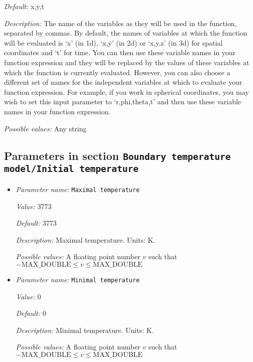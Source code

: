 \begin{itemize}
{\it Default:} x,y,t


{\it Description:} The name of the variables as they will be used in the function, separated by commas. By default, the names of variables at which the function will be evaluated is `x' (in 1d), `x,y' (in 2d) or `x,y,z' (in 3d) for spatial coordinates and `t' for time. You can then use these variable names in your function expression and they will be replaced by the values of these variables at which the function is currently evaluated. However, you can also choose a different set of names for the independent variables at which to evaluate your function expression. For example, if you work in spherical coordinates, you may wish to set this input parameter to `r,phi,theta,t' and then use these variable names in your function expression.


{\it Possible values:} Any string
\end{itemize}

\subsection{Parameters in section \tt Boundary temperature model/Initial temperature}
\label{parameters:Boundary_20temperature_20model/Initial_20temperature}

\begin{itemize}
\item {\it Parameter name:} {\tt Maximal temperature}
\label{parameters:Boundary temperature model/Initial temperature/Maximal temperature}


{\it Value:} 3773


{\it Default:} 3773


{\it Description:} Maximal temperature. Units: K.


{\it Possible values:} A floating point number $v$ such that $-\text{MAX\_DOUBLE} \leq v \leq \text{MAX\_DOUBLE}$
\item {\it Parameter name:} {\tt Minimal temperature}
\label{parameters:Boundary temperature model/Initial temperature/Minimal temperature}


{\it Value:} 0


{\it Default:} 0


{\it Description:} Minimal temperature. Units: K.


{\it Possible values:} A floating point number $v$ such that $-\text{MAX\_DOUBLE} \leq v \leq \text{MAX\_DOUBLE}$
\end{itemize}

